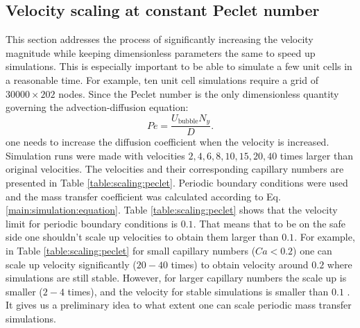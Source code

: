 \documentclass{article}
\newcommand{\beq}{\begin{equation}}
\newcommand{\feq}{\end{equation}}
\newcommand{\ububble}{U_{\mathrm{bubble}}}
\newcommand{\omegaminus}{\omega_{-}}
\begin{document}
\subsection{Velocity scaling at constant Peclet number}
\label{section:keeping:peclet}
This section addresses the process of significantly increasing the
velocity magnitude while keeping dimensionless parameters the same to
speed up                                      
simulations. This is especially important to be able to simulate a few unit cells in a reasonable time.
For example, ten unit cell simulations require a grid of $30000\times202$ nodes.
Since the Peclet number is the only dimensionless quantity governing
the advection-diffusion equation:
\beq
Pe=\frac{\ububble N_y}{D}.
\feq
one needs to increase the diffusion coefficient when the velocity is increased. Simulation runs were made with
velocities $2,4,6,8,10,15,20,40$ times larger than original velocities. The velocities and
their corresponding capillary numbers are presented in Table \ref{table:scaling:peclet}. Periodic
boundary conditions were used and the mass transfer coefficient was calculated according to Eq.
\ref{main:simulation:equation}. Table \ref{table:scaling:peclet} shows that the velocity limit
for  periodic boundary conditions is $0.1$. That means that to be on the safe side one shouldn't scale up velocities to obtain them larger than $0.1$. For example, in Table \ref{table:scaling:peclet} for small capillary numbers ($Ca<0.2$)  one can scale up velocity significantly ($20-40$ times) to obtain velocity around $0.2$ where simulations are still stable. However, for larger capillary numbers the scale up is smaller ($2-4$ times), and the velocity for stable simulations is smaller than $0.1$ .   %
It gives us a
preliminary idea to what extent one can scale periodic mass transfer simulations. 
\end{document}
